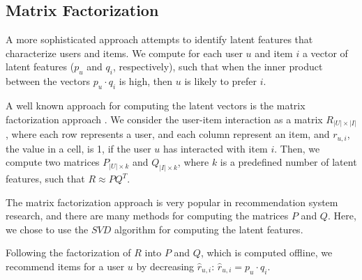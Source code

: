 \documentclass[letterpaper]{article} %
\newcommand{\kibitz}[2]{\ifnum\Comments=1{\textcolor{#1}{#2}}\fi}
\newcommand{\as}[1]{\kibitz{ orange}{[AS:#1]}}
\begin{document}


\subsection{Matrix Factorization}

A more sophisticated approach attempts to identify latent features that characterize users and items. We compute for each user $u$ and item $i$ a vector of latent features ($p_u$ and $q_i$, respectively), such that when the inner product between the vectors $p_u \cdot q_i$ is high, then $u$ is likely to prefer $i$.

A well known approach for computing the latent vectors is the matrix factorization approach \cite{koren2009matrix,koren2015advances}. We consider the user-item interaction as a matrix $R_{|U|\times|I|}$, where each row represents a user, and each column represent an item, and $r_{u,i}$, the value in a cell, is 1, if the user $u$ has interacted with item $i$. Then, we compute two matrices $P_{|U|\times k}$ and $Q_{|I| \times k}$, where $k$ is a predefined number of latent features, such that $R \approx P Q^T$.

The matrix factorization approach is very popular in recommendation system research, and there are many methods for computing the matrices $P$ and $Q$. Here, we chose to use the $SVD$ algorithm \cite{sarwar2002incremental} for computing the latent features.

Following the factorization of $R$ into $P$ and $Q$, which is computed offline, we recommend items for a user $u$ by decreasing $\hat{r}_{u,i}$: $\hat{r}_{u,i}= p_u \cdot q_i$.

 
\end{document}
